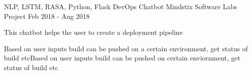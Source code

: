 \begin{cventries}
  
    \cventry
    {NLP, LSTM, RASA, Python, Flask} %
    {DevOps Chatbot} %
    {Mindstix Software Labs Project} %
    {Feb 2018 - Aug 2018} %
    {
      \begin{cvitems} %
        \item {This chatbot helps the user to create a deployment pipeline}
        \item {Based on user inputs build can be pushed on a certain environment, get status of build etcBased on user inputs build can be pushed on certain enviornment, get status of build etc }
      \end{cvitems}
    }
    
  


\end{cventries}
